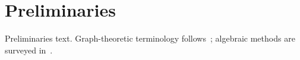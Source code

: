 \chapter{Preliminaries}
\label{ch:preliminaries}

Preliminaries text.
Graph-theoretic terminology follows~\cite{Diestel2025}; algebraic methods are surveyed in~\cite{GodsilRoyle2001}.

%
%
%
%

